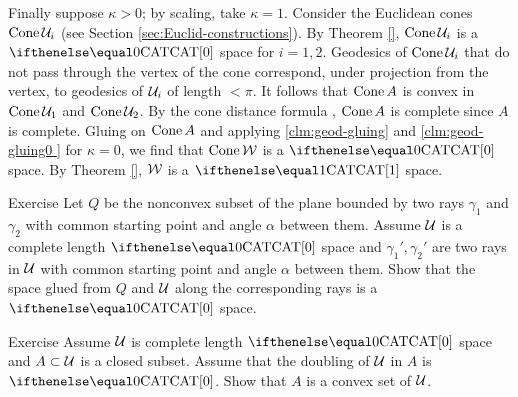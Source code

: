 Finally suppose $\kappa>0$; by  scaling, take $\kappa=1$. Consider the Euclidean cones $\mathop{\rm Cone}\nolimits\mathcal{U}_i$ (see Section \ref{sec:Euclid-constructions}).
By Theorem \ref{}, $\mathop{\rm Cone}\nolimits\mathcal{U}_i$ is a $\CAT0$ space for $i=1,2$. Geodesics of $\mathop{\rm Cone}\nolimits\mathcal{U}_i$ that do not pass through the vertex of the cone correspond, under projection from the vertex, to geodesics of $\mathcal{U}_i$ of length $<\pi$. 
  It follows that $\mathop{\rm Cone}\nolimits A$ is convex in $\mathop{\rm Cone}\nolimits\mathcal{U}_1$ and $\mathop{\rm Cone}\nolimits\mathcal{U}_2$. By the cone distance formula  , $\mathop{\rm Cone}\nolimits A$ is complete since $A$ is complete.
    Gluing on $\mathop{\rm Cone}\nolimits A$ and applying \ref{clm:geod-gluing} and \ref{clm:geod-gluing0 } for $\kappa=0$, we find that 
$\mathop{\rm Cone}\nolimits\mathcal{W}$ is a $\CAT0$ space.  By Theorem \ref{}, $\mathcal{W}$ is a $\CAT1$ space.
\qeds
%
%

\begin{thm}{Exercise}\label{ex:two-rays}
Let $Q$ be the nonconvex subset of the plane 
bounded by two rays $\gamma_1$ and $\gamma_2$
with common starting point and angle $\alpha$ between them.
Assume $\mathcal{U}$ is a complete length $\CAT0$ space
and $\gamma_1',\gamma_2'$ are two rays in $\mathcal{U}$ with common
starting point and angle $\alpha$ between them.
Show that the space glued from $Q$ and $\mathcal{U}$ along the corresponding rays is a $\CAT{0}$ space.
\end{thm}

\begin{thm}{Exercise}\label{ex:reshetnyak-doubling}
Assume $\mathcal{U}$ is complete length $\CAT0$ space and $A\subset \spc{U}$ is a closed subset.
Assume that the doubling of $\mathcal{U}$ in $A$ is $\CAT0$. 
Show that $A$ is a convex set of $\mathcal{U}$.
\end{thm}

